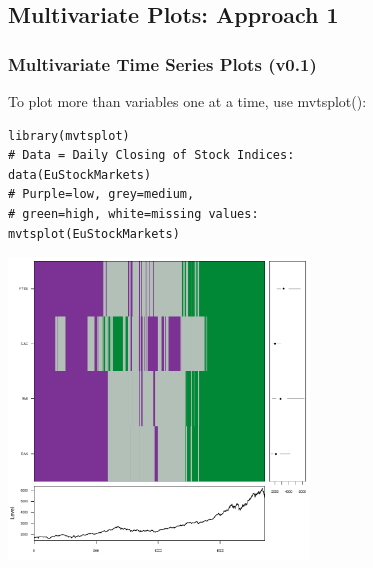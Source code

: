

\subsection{Multivariate Plots: Approach 1}


\begin{frame}
 \frametitle{Multivariate Time Series Plots (v0.1)}

To plot more than variables one at a time, use \ttfamily mvtsplot()\normalfont [5]:
		\begin{lstlisting}
library(mvtsplot)		
# Data = Daily Closing of Stock Indices:
data(EuStockMarkets)
# Purple=low, grey=medium, 
# green=high, white=missing values:
mvtsplot(EuStockMarkets)
		\end{lstlisting}

       \begin{center}
         \includegraphics[width=0.6\textwidth]{images/Mtvsplot1.pdf}
        \end{center}

\end{frame}

